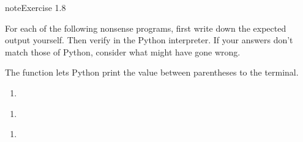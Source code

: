\documentclass[letterpaper,10pt,english]{jupyterBook}
\begin{document}
\begin{sphinxadmonition}{note}{Exercise 1.8}

\sphinxAtStartPar
For each of the following nonsense programs, first write down the expected output yourself. Then verify in the Python interpreter. If your answers don’t match those of Python, consider what might have gone wrong.

\sphinxAtStartPar
The  function lets Python print the value between parentheses to the terminal.
\begin{enumerate}
%
\item {} 
\end{enumerate}

\begin{sphinxVerbatim}[commandchars=\\\{\}]
  
  
\end{sphinxVerbatim}
\begin{enumerate}
%
\setcounter{enumi}{1}
\item {} 
\end{enumerate}

\begin{sphinxVerbatim}[commandchars=\\\{\}]
  
  
  
  
  
  
  
  
\end{sphinxVerbatim}
\begin{enumerate}
%
\setcounter{enumi}{2}
\item {} 
\end{enumerate}


\end{sphinxadmonition}
\end{document}
